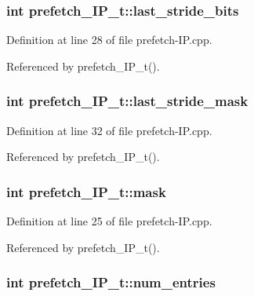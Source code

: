\subsubsection[{last\_\-stride\_\-bits}]{\setlength{\rightskip}{0pt plus 5cm}int {\bf prefetch\_\-IP\_\-t::last\_\-stride\_\-bits}\hspace{0.3cm}{\tt  [protected]}}\label{classprefetch__IP__t_fc054732f7f7217095708c531bdff9c6}




Definition at line 28 of file prefetch-IP.cpp.

Referenced by prefetch\_\-IP\_\-t().
\subsubsection[{last\_\-stride\_\-mask}]{\setlength{\rightskip}{0pt plus 5cm}int {\bf prefetch\_\-IP\_\-t::last\_\-stride\_\-mask}\hspace{0.3cm}{\tt  [protected]}}\label{classprefetch__IP__t_99ec3f726833524b681b2d9d53cd80f4}




Definition at line 32 of file prefetch-IP.cpp.

Referenced by prefetch\_\-IP\_\-t().
\subsubsection[{mask}]{\setlength{\rightskip}{0pt plus 5cm}int {\bf prefetch\_\-IP\_\-t::mask}\hspace{0.3cm}{\tt  [protected]}}\label{classprefetch__IP__t_384a07e279aeba826c8296bb4af68cfd}




Definition at line 25 of file prefetch-IP.cpp.

Referenced by prefetch\_\-IP\_\-t().
\subsubsection[{num\_\-entries}]{\setlength{\rightskip}{0pt plus 5cm}int {\bf prefetch\_\-IP\_\-t::num\_\-entries}\hspace{0.3cm}{\tt  [protected]}}\label{classprefetch__IP__t_2d044c5fdc2749446bf0154b6868c909}




